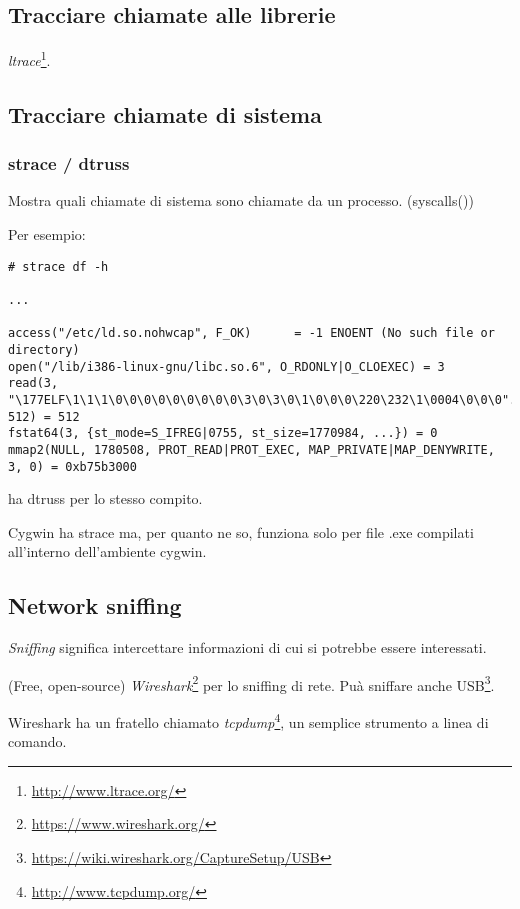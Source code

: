 \subsection{Tracciare chiamate alle librerie}

\emph{ltrace}\footnote{\url{http://www.ltrace.org/}}.

\subsection{Tracciare chiamate di sistema}

\label{strace}
\subsubsection{strace / dtruss}

Mostra quali chiamate di sistema sono chiamate da un processo. (syscalls())

Per esempio:

\begin{lstlisting}
# strace df -h

...

access("/etc/ld.so.nohwcap", F_OK)      = -1 ENOENT (No such file or directory)
open("/lib/i386-linux-gnu/libc.so.6", O_RDONLY|O_CLOEXEC) = 3
read(3, "\177ELF\1\1\1\0\0\0\0\0\0\0\0\0\3\0\3\0\1\0\0\0\220\232\1\0004\0\0\0"..., 512) = 512
fstat64(3, {st_mode=S_IFREG|0755, st_size=1770984, ...}) = 0
mmap2(NULL, 1780508, PROT_READ|PROT_EXEC, MAP_PRIVATE|MAP_DENYWRITE, 3, 0) = 0xb75b3000
\end{lstlisting}

\myindex{\MacOSX}
\MacOSX ha dtruss per lo stesso compito.

Cygwin ha strace ma, per quanto ne so, funziona solo per file .exe compilati all'interno dell'ambiente
cygwin.

\subsection{Network sniffing}

\emph{Sniffing} significa intercettare informazioni di cui si potrebbe essere interessati.

(Free, open-source) \emph{Wireshark}\footnote{\url{https://www.wireshark.org/}} per lo sniffing di rete.
Puà sniffare anche USB\footnote{\url{https://wiki.wireshark.org/CaptureSetup/USB}}.

Wireshark ha un fratello chiamato \emph{tcpdump}\footnote{\url{http://www.tcpdump.org/}}, un semplice strumento a linea di comando.

